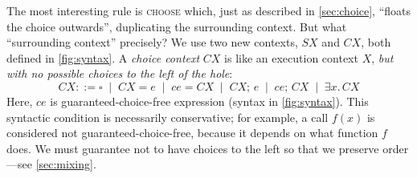 \documentclass[acmsmall,review,dvipsnames]{acmart}
\newcommand{\Conid}[1]{\mathit{#1}}
\newcommand{\Varid}[1]{\mathit{#1}}
\newcommand{\rulename}[1]{\textsc{\small #1}}
\newcommand{\vb}{\; \ensuremath{\mathop{\mid}} \;}    %
\newcommand{\hole}{\square}
\begin{document}
The most interesting rule is \rulename{choose} which, just as described in \cref{sec:choice},
``floats the choice outwards'', duplicating the surrounding context.
But what ``surrounding context'' precisely? We use two new contexts, \ensuremath{\Conid{SX}} and \ensuremath{CX}, both
defined in \cref{fig:syntax}. A \emph{choice context} \ensuremath{CX} is like an
execution context \ensuremath{X}, \emph{but with no possible
  choices to the left of the hole}:
$$
CX ::= \hole \vb \ensuremath{CX=\Varid{e}} \vb \ensuremath{\Varid{ce}=CX} \vb \ensuremath{CX;\,\Varid{e}} \vb \ensuremath{\Varid{ce};\,CX}
\vb \ensuremath{\exists\Varid{x}.\,CX}
$$
Here, \ensuremath{\Varid{ce}} is guaranteed-choice-free expression (syntax in \cref{fig:syntax}).
This syntactic condition is necessarily conservative; for example, a call \ensuremath{\Varid{f}(\Varid{x})}
is considered not guaranteed-choice-free, because it depends on what function \ensuremath{\Varid{f}} does.
We must guarantee not to have choices to the left so that we preserve order---see \cref{sec:mixing}.
\end{document}
